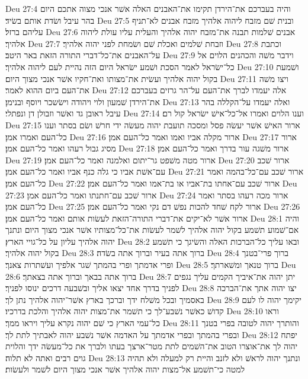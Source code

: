 Deu 27:4  והיה בעברכם את־הירדן תקימו את־האבנים האלה אשׁר אנכי מצוה אתכם היום בהר עיבל ושׂדת אותם בשׂיד׃
Deu 27:5  ובנית שׁם מזבח ליהוה אלהיך מזבח אבנים לא־תניף עליהם ברזל׃
Deu 27:6  אבנים שׁלמות תבנה את־מזבח יהוה אלהיך והעלית עליו עולת ליהוה אלהיך׃
Deu 27:7  וזבחת שׁלמים ואכלת שׁם ושׂמחת לפני יהוה אלהיך׃
Deu 27:8  וכתבת על־האבנים את־כל־דברי התורה הזאת באר היטב׃
Deu 27:9  וידבר משׁה והכהנים הלוים אל כל־ישׂראל לאמר הסכת ושׁמע ישׂראל היום הזה נהיית לעם ליהוה אלהיך׃
Deu 27:10  ושׁמעת בקול יהוה אלהיך ועשׂית את־מצותו ואת־חקיו אשׁר אנכי מצוך היום׃
Deu 27:11  ויצו משׁה את־העם ביום ההוא לאמר׃
Deu 27:12  אלה יעמדו לברך את־העם על־הר גרזים בעברכם את־הירדן שׁמעון ולוי ויהודה וישׂשכר ויוסף ובנימן׃
Deu 27:13  ואלה יעמדו על־הקללה בהר עיבל ראובן גד ואשׁר וזבולן דן ונפתלי׃
Deu 27:14  וענו הלוים ואמרו אל־כל־אישׁ ישׂראל קול רם׃
Deu 27:15  ארור האישׁ אשׁר יעשׂה פסל ומסכה תועבת יהוה מעשׂה ידי חרשׁ ושׂם בסתר וענו כל־העם ואמרו אמן׃
Deu 27:16  ארור מקלה אביו ואמו ואמר כל־העם אמן׃
Deu 27:17  ארור מסיג גבול רעהו ואמר כל־העם אמן׃
Deu 27:18  ארור משׁגה עור בדרך ואמר כל־העם אמן׃
Deu 27:19  ארור מטה משׁפט גר־יתום ואלמנה ואמר כל־העם אמן׃
Deu 27:20  ארור שׁכב עם־אשׁת אביו כי גלה כנף אביו ואמר כל־העם אמן׃
Deu 27:21  ארור שׁכב עם־כל־בהמה ואמר כל־העם אמן׃
Deu 27:22  ארור שׁכב עם־אחתו בת־אביו או בת־אמו ואמר כל־העם אמן׃
Deu 27:23  ארור שׁכב עם־חתנתו ואמר כל־העם אמן׃
Deu 27:24  ארור מכה רעהו בסתר ואמר כל־העם אמן׃
Deu 27:25  ארור לקח שׁחד להכות נפשׁ דם נקי ואמר כל־העם אמן׃
Deu 27:26  ארור אשׁר לא־יקים את־דברי התורה־הזאת לעשׂות אותם ואמר כל־העם אמן׃
Deu 28:1  והיה אם־שׁמוע תשׁמע בקול יהוה אלהיך לשׁמר לעשׂות את־כל־מצותיו אשׁר אנכי מצוך היום ונתנך יהוה אלהיך עליון על כל־גויי הארץ׃
Deu 28:2  ובאו עליך כל־הברכות האלה והשׂיגך כי תשׁמע בקול יהוה אלהיך׃
Deu 28:3  ברוך אתה בעיר וברוך אתה בשׂדה׃
Deu 28:4  ברוך פרי־בטנך ופרי אדמתך ופרי בהמתך שׁגר אלפיך ועשׁתרות צאנך׃
Deu 28:5  ברוך טנאך ומשׁארתך׃
Deu 28:6  ברוך אתה בבאך וברוך אתה בצאתך׃
Deu 28:7  יתן יהוה את־איביך הקמים עליך נגפים לפניך בדרך אחד יצאו אליך ובשׁבעה דרכים ינוסו לפניך׃
Deu 28:8  יצו יהוה אתך את־הברכה באסמיך ובכל משׁלח ידך וברכך בארץ אשׁר־יהוה אלהיך נתן לך׃
Deu 28:9  יקימך יהוה לו לעם קדושׁ כאשׁר נשׁבע־לך כי תשׁמר את־מצות יהוה אלהיך והלכת בדרכיו׃
Deu 28:10  וראו כל־עמי הארץ כי שׁם יהוה נקרא עליך ויראו ממך׃
Deu 28:11  והותרך יהוה לטובה בפרי בטנך ובפרי בהמתך ובפרי אדמתך על האדמה אשׁר נשׁבע יהוה לאבתיך לתת לך׃
Deu 28:12  יפתח יהוה לך את־אוצרו הטוב את־השׁמים לתת מטר־ארצך בעתו ולברך את כל־מעשׂה ידך והלוית גוים רבים ואתה לא תלוה׃
Deu 28:13  ונתנך יהוה לראשׁ ולא לזנב והיית רק למעלה ולא תהיה למטה כי־תשׁמע אל־מצות יהוה אלהיך אשׁר אנכי מצוך היום לשׁמר ולעשׂות׃
